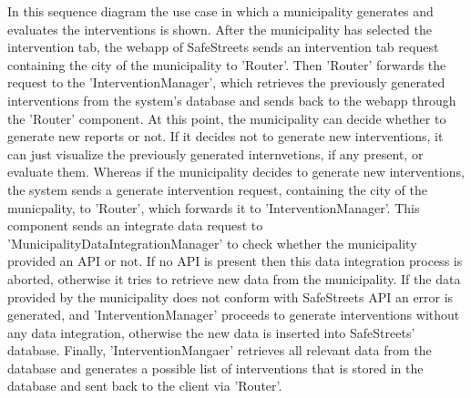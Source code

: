 In this sequence diagram the use case in which a municipality generates and evaluates the interventions is shown. After the municipality has selected the intervention tab, the webapp of SafeStreets sends an intervention tab request containing the city of the municipality to 'Router'. Then 'Router' forwards the request to the 'InterventionManager', which retrieves the previously generated interventions from the system's database and sends back to the webapp through the 'Router' component. At this point, the municipality can decide whether to generate new reports or not. If it decides not to generate new interventions, it can just visualize the previously generated internvetions, if any present, \color{red}or evaluate them. \color{black} Whereas if the municipality decides to generate new interventions, the system sends a generate intervention request, containing the city of the municpality, to 'Router', which forwards it to 'InterventionManager'. This component sends an integrate data request to 'MunicipalityDataIntegrationManager' to check whether the municipality provided an API or not. If no API is present then this data integration process is aborted, otherwise it tries to retrieve new data from the municipality. If the data provided by the municipality does not conform with SafeStreets API an error is generated, and 'InterventionManager' proceeds to generate interventions without any data integration, otherwise the new data is inserted into SafeStreets' database. Finally, 'InterventionMangaer' retrieves all relevant data from the database and generates a possible list of interventions that is stored in the database and sent back to the client via 'Router'.